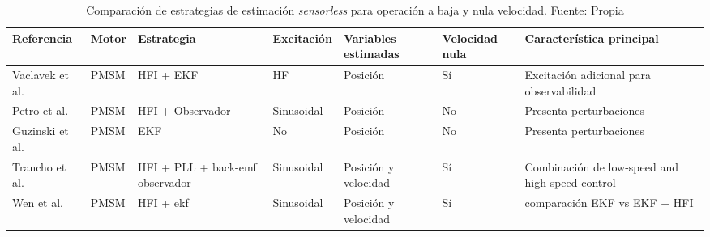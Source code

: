 \begin{table}[htbp]
    \centering
    \caption{Comparación de estrategias de estimación \textit{sensorless}
    para operación a baja y nula velocidad. Fuente: Propia}
    \label{tab:comparacion_sensorless_baja_velocidad}

    \small
    \renewcommand{\arraystretch}{1.3}

    \begin{adjustbox}{max width=\textwidth}
    \begin{tabular}{lllllll}
        \toprule

        \textbf{Referencia} &
        \textbf{Motor} &
        \textbf{Estrategia} &
        \textbf{Excitación} &
        \textbf{Variables estimadas} &
        \textbf{Velocidad nula} &
        \textbf{Característica principal} \\

        \midrule

        Vaclavek et al. \cite{vaclavekACDriveObservability2013} &
        PMSM &
        HFI + EKF &
        HF &
        Posición &
        Sí &
        Excitación adicional para observabilidad \\

        \addlinespace

        Petro et al. \cite{petroHFPulseSignal2025} &
        PMSM &
        HFI + Observador &
        Sinusoidal &
        Posición &
        No &
        Presenta perturbaciones \\

        \addlinespace

        Guzinski et al. \cite{guzinskiSensorlessLowSpeed2019} &
        PMSM &
        EKF &
        No &
        Posición&
        No &
        Presenta perturbaciones \\

        \addlinespace

        Trancho et al. \cite{tranchoNovelPMSMHybrid2016} &
        PMSM &
        HFI + PLL + back-emf observador&
        Sinusoidal &
        Posición y velocidad &
        Sí &
        Combinación de low-speed and high-speed control \\

        \addlinespace

        Wen et al.\cite{wenObservabilityAnalysisEKFbased2017} &
        PMSM &
        HFI + ekf &
        Sinusoidal &
        Posición y velocidad &
        Sí &
        comparación EKF vs EKF + HFI \\



\end{tabular}
\end{adjustbox}
\end{table}
